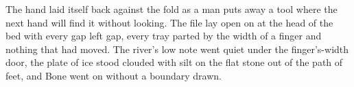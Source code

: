 The hand laid itself back against the fold as a man puts away a tool where the next hand will find it without looking. The file lay open on  at the head of the bed with every gap left gap, every tray parted by the width of a finger and nothing that had moved. The river's low note went quiet under the finger's-width door, the plate of ice stood clouded with silt on the flat stone out of the path of feet, and Bone went on without a boundary drawn.
